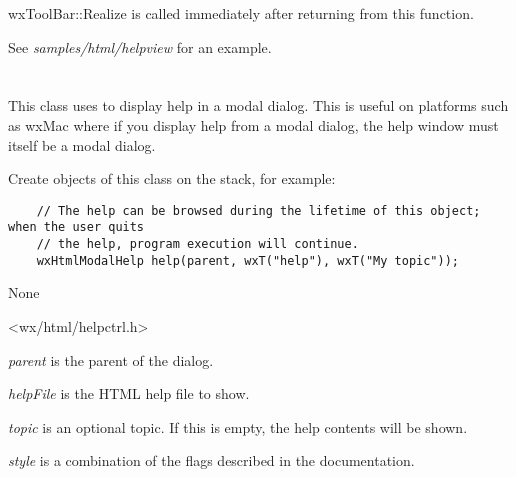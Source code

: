 wxToolBar::Realize is called immediately after returning from this function.

See {\it samples/html/helpview} for an example.

\section{}\label{wxhtmlmodalhelp}

This class uses  
to display help in a modal dialog. This is useful on platforms such as wxMac
where if you display help from a modal dialog, the help window must itself be a modal
dialog.

Create objects of this class on the stack, for example:

\begin{verbatim}
    // The help can be browsed during the lifetime of this object; when the user quits
    // the help, program execution will continue.
    wxHtmlModalHelp help(parent, wxT("help"), wxT("My topic"));
\end{verbatim}


None


<wx/html/helpctrl.h>


\label{wxhtmlmodalhelpctor}



{\it parent} is the parent of the dialog.

{\it helpFile} is the HTML help file to show.

{\it topic} is an optional topic. If this is empty, the help contents will be shown.

{\it style} is a combination of the flags described in the  documentation.


